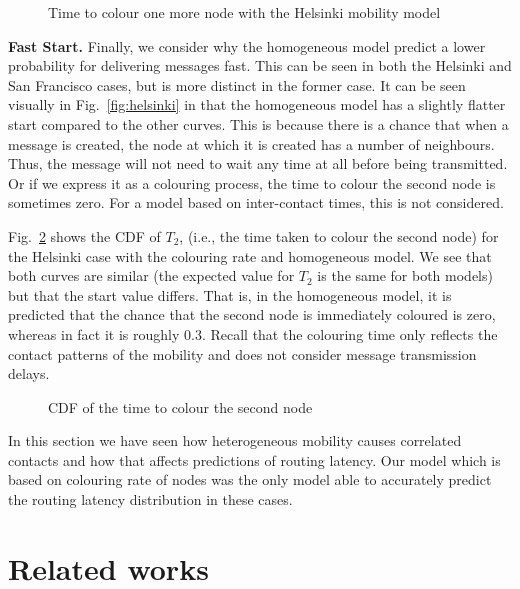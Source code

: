 \documentclass{article}
\begin{document}
\begin{figure}[htb]
  \centering
   \caption{Time to colour one more node with the Helsinki mobility model}
  \label{fig:helsinki-fdelta}
\end{figure}


{\bf Fast Start.} Finally, we consider why the homogeneous model
predict a lower probability for delivering messages fast. This can be
seen in both the Helsinki and San Francisco cases, but is more
distinct in the former case. It can be seen visually in
Fig.~\ref{fig:helsinki} in that the homogeneous model has a slightly
flatter start compared to the other curves. This is because there is a
chance that when a message is created, the node at which it is created
has a number of neighbours. Thus, the message will not need to wait
any time at all before being transmitted. Or if we express it as a
colouring process, the time to colour the second node is sometimes
zero. For a model based on inter-contact times, this is not
considered.


Fig.~\ref{fig:colsecond} shows the CDF of $T_2$, (i.e., the time
taken to colour the second node) for the Helsinki case with the
colouring rate and homogeneous model. We see that both curves are
similar (the expected value for $T_2$ is the same for both models) but
that the start value differs. That is, in the homogeneous model, it is
predicted that the chance that the second node is immediately
coloured is zero, whereas in fact it is roughly 0.3. Recall that the
colouring time only reflects the contact patterns of the mobility and
does not consider message transmission delays.

\begin{figure}[tb]
  \centering
   \caption{CDF of the time to colour the second node}
  \label{fig:colsecond}
\end{figure}
In this section we have seen how heterogeneous mobility causes
correlated contacts and how that affects predictions of routing
latency. Our model which is based on colouring rate of nodes was the
only model able to accurately predict the routing latency distribution
in these cases.



\section{Related works}
\label{sec:relatedworks}
\end{document}
